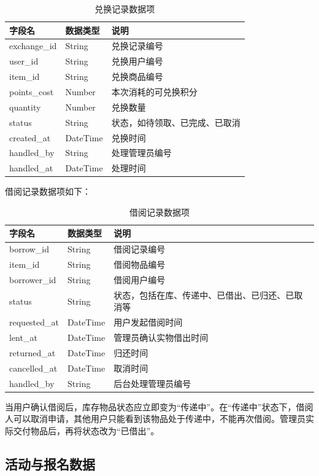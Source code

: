 \documentclass[a4paper,12pt]{article}
\begin{document}
\begin{longtable}{p{3.5cm}p{3cm}p{7cm}}
\caption{兑换记录数据项} \\
\toprule
字段名 & 数据类型 & 说明 \\
\midrule
exchange\_id & String & 兑换记录编号 \\
user\_id & String & 兑换用户编号 \\
item\_id & String & 兑换商品编号 \\
points\_cost & Number & 本次消耗的可兑换积分 \\
quantity & Number & 兑换数量 \\
status & String & 状态，如待领取、已完成、已取消 \\
created\_at & DateTime & 兑换时间 \\
handled\_by & String & 处理管理员编号 \\
handled\_at & DateTime & 处理时间 \\
\bottomrule
\end{longtable}

借阅记录数据项如下：

\begin{longtable}{p{3.5cm}p{3cm}p{7cm}}
\caption{借阅记录数据项} \\
\toprule
字段名 & 数据类型 & 说明 \\
\midrule
borrow\_id & String & 借阅记录编号 \\
item\_id & String & 借阅物品编号 \\
borrower\_id & String & 借阅用户编号 \\
status & String & 状态，包括在库、传递中、已借出、已归还、已取消等 \\
requested\_at & DateTime & 用户发起借阅时间 \\
lent\_at & DateTime & 管理员确认实物借出时间 \\
returned\_at & DateTime & 归还时间 \\
cancelled\_at & DateTime & 取消时间 \\
handled\_by & String & 后台处理管理员编号 \\
\bottomrule
\end{longtable}

当用户确认借阅后，库存物品状态应立即变为“传递中”。在“传递中”状态下，借阅人可以取消申请，其他用户只能看到该物品处于传递中，不能再次借阅。管理员实际交付物品后，再将状态改为“已借出”。

\subsection{活动与报名数据}
\end{document}
